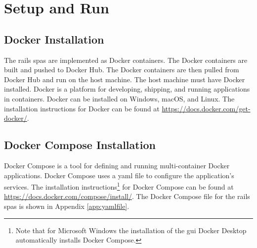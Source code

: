 \chapter{Setup and Run}
\label{ch:installandrun}
\section{Docker Installation}
\label{sec:dockerinstall}
The \gls{rails} \glspl{spa} are implemented as Docker containers. The Docker containers are built and pushed to Docker Hub. The Docker containers are then pulled from Docker Hub and run on the host machine. 
The host machine must have Docker installed. Docker is a platform for developing, shipping, and running applications in containers. Docker can be installed on Windows, macOS, and Linux. 
The installation instructions for Docker can be found at \href{https://docs.docker.com/get-docker/}{https://docs.docker.com/get-docker/}.
\section{Docker Compose Installation}
\label{sec:dockercomposeinstall}
Docker Compose is a tool for defining and running multi-container Docker applications. Docker Compose uses a \gls{yaml} file to configure the application's services. The installation instructions\footnote{Note that for Microsoft Windows the installation of the \gls{gui} Docker Desktop automatically installs Docker Compose.} for Docker Compose can be found at \href{https://docs.docker.com/compose/install/}{https://docs.docker.com/compose/install/}.  The Docker Compose file for the \gls{rails} \glspl{spa} is shown in Appendix \ref{app:yamlfile}.
